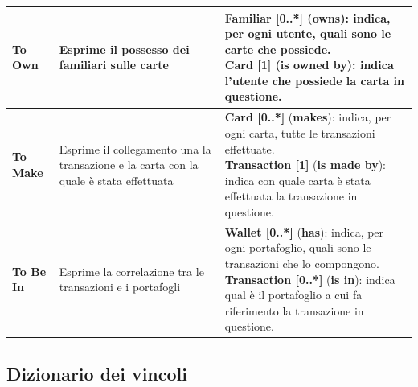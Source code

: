 \begin{longtable}{m{2.7cm}|m{4cm}|m{7cm}}
    \raggedright \textbf{To Own} & \raggedright Esprime il possesso dei familiari sulle carte &
    \parbox{7cm}{
        \textbf{Familiar [0..*]} (\textbf{owns}): indica, per ogni utente, quali sono le carte che possiede. \\
        \textbf{Card [1]} (\textbf{is owned by}): indica l'utente che possiede la carta in questione.
    } \\ \hline

    \raggedright \textbf{To Make} & \raggedright Esprime il collegamento una la transazione e la carta con la quale è stata effettuata &
    \parbox{7cm}{
        \textbf{Card [0..*]} (\textbf{makes}): indica, per ogni carta, tutte le transazioni effettuate. \\
        \textbf{Transaction [1]} (\textbf{is made by}): indica con quale carta è stata effettuata la transazione in questione.
    } \\ \hline

    \raggedright \textbf{To Be In} & \raggedright Esprime la correlazione tra le transazioni e i portafogli &
    \parbox{7cm}{
        \textbf{Wallet [0..*]} (\textbf{has}): indica, per ogni portafoglio, quali sono le transazioni che lo compongono. \\
        \textbf{Transaction [0..*]} (\textbf{is in}): indica qual è il portafoglio a cui fa riferimento la transazione in questione.
    } \\ \hline

\end{longtable}

\subsection{Dizionario dei vincoli}

